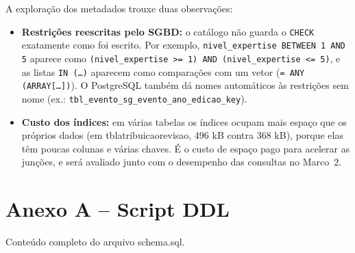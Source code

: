 \documentclass[12pt,a4paper]{article}
\newcommand{\tbus}{\textunderscore\allowbreak}
\newcommand{\tb}[1]{{\ttfamily\let\_\tbus #1}}
\begin{document}
A exploração dos metadados trouxe duas observações:
\begin{itemize}
    \item \textbf{Restrições reescritas pelo SGBD:} o catálogo não guarda o
    \texttt{CHECK} exatamente como foi escrito. Por exemplo,
    \texttt{nivel\_expertise BETWEEN 1 AND 5} aparece como
    \texttt{(nivel\_expertise >= 1) AND (nivel\_expertise <= 5)}, e as listas
    \texttt{IN (\dots)} aparecem como comparações com um vetor (\texttt{= ANY (ARRAY[\dots])}).
    O PostgreSQL também dá nomes automáticos às restrições sem nome
    (ex.: \texttt{tbl\_evento\_sg\_evento\_ano\_edicao\_key}).
    \item \textbf{Custo dos índices:} em várias tabelas os índices ocupam mais espaço que
    os próprios dados (em \tb{tbl\_atribuicao\_revisao}, 496 kB contra 368 kB), porque
    elas têm poucas colunas e várias chaves. É o custo de espaço pago para acelerar as
    junções, e será avaliado junto com o desempenho das consultas no Marco~2.
\end{itemize}

\renewcommand{\refname}{Referências}



\section*{Anexo A -- Script DDL}
Conteúdo completo do arquivo \tb{schema.sql}.


\end{document}

